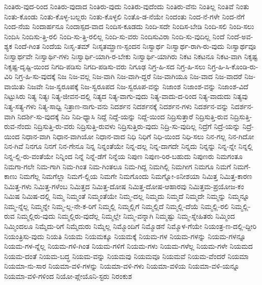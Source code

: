 {ನಿಂತಿರು-ವುದ-ರಿಂದ
ನಿಂತಿರು-ವುದಾದ
ನಿಂತಿರು-ವುದು
ನಿಂತಿರು-ವುದೆಂದು
ನಿಂತಿರು-ವೆನು
ನಿಂತಿಲ್ಲ
ನಿಂತಿವೆ
ನಿಂತು
ನಿಂತು-ಕೊಂಡು
ನಿಂತು-ಕೊಳ್ಳ-ಬಲ್ಲರು
ನಿಂತು-ಕೊಳ್ಳಲಿ
ನಿಂತೊ-ಡ-ನೆಯೇ
ನಿಂದಂತು
ನಿಂದ-ನೆ-ಗಳೇ
ನಿಂದ-ನೆಗೆ
ನಿಂದ-ನೆಯ
ನಿಂದಾರ್ಹನೂ
ನಿಂದಾಸ್ಪದ-ವಾದ
ನಿಂದಿಸ-ಕೂಡದು
ನಿಂದಿ-ಸದೇ
ನಿಂದಿಸ-ಬೇಡಿ
ನಿಂದಿ-ಸಲಿ
ನಿಂದಿ-ಸಲು
ನಿಂದಿಸಿ
ನಿಂದಿಸು-ತ್ತಿ-ರಲಿ
ನಿಂದಿ-ಸು-ತ್ತಿ-ರಲಿಲ್ಲ
ನಿಂದಿ-ಸು-ವರು
ನಿಂದಿಸುವಿರಾ
ನಿಂದಿ-ಸು-ವುದಿಲ್ಲ
ನಿಂದೆ
ನಿಂದೆ-ಅವ-ಶ್ಯಕ
ನಿಂದೆ-ಗಿಂತ
ನಿಂದೆಯ
ನಿಃಸೃ-ತಮ್
ನಿಃಸೃತಮ್ಪ್ರಾಣ-ಸ್ಪಂದನ
ನಿಃಸ್ವಾರ್ಥ
ನಿಃಸ್ವಾರ್ಥ-ರಾಗಿ-ರು-ವುದು
ನಿಃಸ್ವಾರ್ಥವೂ
ನಿಃಸ್ವಾರ್ಥವೇ
ನಿಃಸ್ವಾರ್ಥಿ-ಗಳು
ನಿಃಸ್ವಾರ್ಥಿ-ಯಾಗಿ-ರ-ಬೇಕು
ನಿಃಸ್ವಾರ್ಥಿ-ಯಾಗಿರು
ನಿಕಟ
ನಿಕಟನೂ
ನಿಕಟ-ವಾಗಿ
ನಿಕೃಷ್ಟ
ನಿಕೃಷ್ಟ-ದೃಷ್ಟಿ-ಯಿಂದ
ನಿಗದಿ-ಪಡಿಸು
ನಿಗದಿ-ಪಡಿಸು-ವರು
ನಿಗೂಢ
ನಿಗ್ರ-ಹಿ-ಸದ
ನಿಗ್ರ-ಹಿ-ಸಲು
ನಿಗ್ರ-ಹಿ-ಸಿ-ಕೊಂಡಿ-ರು-ವಿರಿ
ನಿಗ್ರ-ಹಿ-ಸು-ವುದಕ್ಕೆ
ನಿಜ
ನಿಜ-ವಲ್ಲ
ನಿಜ-ವಾಗಿ
ನಿಜ-ವಾಗಿ-ದ್ದರೆ
ನಿಜ-ವಾಗಿಯೂ
ನಿಜ-ವಾದ
ನಿಜ-ವಾದರೆ
ನಿಜ-ವಾಯಿತು
ನಿಜವೇ
ನಿಜ-ಸ್ವರೂಪಕ್ಕೆ
ನಿಜ-ಸ್ವರೂಪದ
ನಿಜ-ಸ್ವರೂಪ-ವನ್ನು
ನಿಜಾಂಶ
ನಿಜಾಂಶ-ವನ್ನು
ನಿಜಾಂಶ-ವಿದೆ
ನಿಟ್ಟುಸಿರು
ನಿತ್ಯ
ನಿತ್ಯಃ
ನಿತ್ಯ-ಜೀವನ-ದಲ್ಲಿ
ನಿತ್ಯದ
ನಿತ್ಯ-ವಾಗು-ವುದು
ನಿತ್ಯ-ವಾದು-ದ-ರಿಂದ
ನಿತ್ಯ-ವಾದುದು
ನಿತ್ಯವು
ನಿತ್ಯ-ಸತ್ಯ-ಗಳು
ನಿತ್ಯ-ಸಾಧ್ವಿ
ನಿತ್ರಾಣ-ನಾಗು-ವನು
ನಿದರ್ಶನ
ನಿದರ್ಶನಕ್ಕೆ
ನಿದರ್ಶನ-ಗಳು
ನಿದರ್ಶನ-ವನ್ನು
ನಿದರ್ಶನ-ವಾಗಿ
ನಿದರ್ಶಿ-ಸು-ವುದಕ್ಕೆ
ನಿದಿ
ನಿದಿ-ಧ್ಯಾಸಿ
ನಿದ್ದೆ
ನಿದ್ದೆ-ಯನ್ನು
ನಿದ್ದೆ-ಯಿಂದ
ನಿದ್ರಿಸುತ್ತಾರೆ
ನಿದ್ರಿಸುತ್ತಿ-ರುವ
ನಿದ್ರಿಸುತ್ತಿ-ರುವ-ನೆಂದು
ನಿದ್ರಿಸುತ್ತಿ-ರು-ವರು
ನಿದ್ರಿಸುತ್ತಿ-ರುವಳು
ನಿದ್ರಿಸುತ್ತಿರು-ವುದು
ನಿದ್ರಿ-ಸು-ವುದಿಲ್ಲ
ನಿದ್ರೆಗೆ
ನಿದ್ರೆ-ಯನ್ನು
ನಿದ್ರೆ-ಯಿಂದ
ನಿಧಾನ-ವಾಗಿ
ನಿಧಾನ-ವಾಗಿಯೋ
ನಿಧಾನ-ವಾದ
ನಿಧಿ
ನಿಧಿಗೆ
ನಿಧಿ-ಯಿಂದ
ನಿಧಿ-ಸಲು
ನಿನ-ಗಲ್ಲ
ನಿನ-ಗಿದೋ
ನಿನ-ಗಿವೆ
ನಿನಗೂ
ನಿನಗೆ
ನಿನ-ಗೇನೂ
ನಿನ್ನ
ನಿನ್ನಂತೆಯೇ
ನಿನ್ನ-ದಲ್ಲ
ನಿನ್ನ-ದಾಗದೇ
ನಿನ್ನದು
ನಿನ್ನನ್ನು
ನಿನ್ನ-ನ್ನೇ
ನಿನ್ನಲ್ಲಿ
ನಿನ್ನ-ಲ್ಲಿ-ರು-ವಂತೆಯೇ
ನಿನ್ನಿಂದ
ನಿನ್ನೆ
ನಿನ್ನೆ-ಡೆಗೆ
ನಿನ್ನೆಯ
ನಿಪುಣ
ನಿಪುಣ-ರಿರ-ಬಹುದು
ನಿಪುಣರು
ನಿಮಗಂತೂ
ನಿಮಗಾ-ಗಲೇ
ನಿಮ-ಗಾಗಿ
ನಿಮ-ಗಿಂತ
ನಿಮ-ಗಿಂತಲೂ
ನಿಮ-ಗಿದ್ದ
ನಿಮಗಿಲ್ಲಿ
ನಿಮಗೀಗ
ನಿಮಗೂ
ನಿಮಗೆ
ನಿಮಗೆ-ಕಾಣು
ನಿಮಗೆಲ್ಲ
ನಿಮಗೆಲ್ಲಾ
ನಿಮಗೆ-ಲ್ಲಿಯ
ನಿಮಗೇ
ನಿಮಗೊಂದು
ನಿಮಗ್ನೋ-ಽನೀಶಯಾ
ನಿಮಿತ್ತ
ನಿಮಿತ್ತ-ಕಾರಣ
ನಿಮಿತ್ತ-ಗಳು
ನಿಮಿತ್ತ-ಗಳೆಂಬ
ನಿಮಿತ್ತದ
ನಿಮಿತ್ತ-ದೋಷ
ನಿಮಿತ್ತ-ದೋಷ-ಆಹಾರವು
ನಿಮಿತ್ತಮ-ಪ್ರಯೋಜ-ಕಂ
ನಿಮಿಷ
ನಿಮಿಷ-ದಲ್ಲಿ
ನಿಮ್ಮ
ನಿಮ್ಮಂತೆ
ನಿಮ್ಮಂತೆಯೇ
ನಿಮ್ಮ-ದಲ್ಲ
ನಿಮ್ಮದು
ನಿಮ್ಮದೆ
ನಿಮ್ಮದೇ
ನಿಮ್ಮನ್ನು
ನಿಮ್ಮನ್ನೂ
ನಿಮ್ಮ-ನ್ನೆಲ್ಲ
ನಿಮ್ಮನ್ನೇ
ನಿಮ್ಮ-ಲ್ಲ-ನೇ-ಕ-ರಿಗೆ
ನಿಮ್ಮಲ್ಲಿ
ನಿಮ್ಮಲ್ಲಿಗೆ
ನಿಮ್ಮಲ್ಲಿದೆ
ನಿಮ್ಮಲ್ಲಿ-ದೆಯೆ
ನಿಮ್ಮಲ್ಲಿ-ರಲಿ
ನಿಮ್ಮಲ್ಲಿ-ರುವ
ನಿಮ್ಮಲ್ಲಿರು-ವುದು
ನಿಮ್ಮಲ್ಲಿರು-ವುದೆಲ್ಲ
ನಿಮ್ಮಲ್ಲೇ
ನಿಮ್ಮ-ವನ್ನಾಗಿ
ನಿಮ್ಮಷ್ಟು
ನಿಮ್ಮ-ಸ್ನೇಹಿತರು
ನಿಮ್ಮಿಂದ
ನಿಮ್ಮಿಂದಲೂ
ನಿಮ್ಮೆದು-ರಿಗೆ
ನಿಮ್ಮೆದುರು
ನಿಮ್ಮೆಲ್ಲ
ನಿಮ್ಮೊಂದಿಗೆ
ನಿಮ್ಮೊಡನೆ
ನಿಮ್ಮೊಳ-ಗೆಯೇ
ನಿಯಂತ್ರ-ಣ-ದಲ್ಲಿ-ದ್ದೀರಿ
ನಿಯಂತ್ರಿಸು-ವುದು
ನಿಯತಿ
ನಿಯಮ
ನಿಯಮಕ್ಕೂ
ನಿಯಮಕ್ಕೆ
ನಿಯಮ-ಗಳ
ನಿಯಮ-ಗಳನ್ನು
ನಿಯಮ-ಗಳನ್ನೂ
ನಿಯಮ-ಗಳ-ನ್ನೆಲ್ಲ
ನಿಯಮ-ಗಳಿ-ಗಿಂತ
ನಿಯಮ-ಗಳಿಗೆ
ನಿಯಮ-ಗಳು
ನಿಯಮ-ಗಳೆಲ್ಲ
ನಿಯಮ-ಗಳೇ
ನಿಯಮದ
ನಿಯಮ-ದಂತೆ
ನಿಯಮ-ಬದ್ಧ
ನಿಯಮ-ವನ್ನು
ನಿಯಮವು
ನಿಯಮವೂ
ನಿಯಮವೆ
ನಿಯಮ-ವೆಂದರೆ
ನಿಯಮಾ
ನಿಯಮಾ-ನು-ಸಾರ
ನಿಯಮಾ-ವಳಿ-ಗಳನ್ನು
ನಿಯಮಾ-ವಳಿ-ಗಳು
ನಿಯಮಾ-ವಳಿಯ
ನಿಯಮಾ-ವಳಿ-ಯನ್ನೂ
ನಿಯಮಾ-ವಳಿ-ಗಳಿಂದ
ನಿಯೋ-ಪ್ಲೇಯೊನಿ-ಸ್ಟರು
ನಿರಂಕುಶ
}
